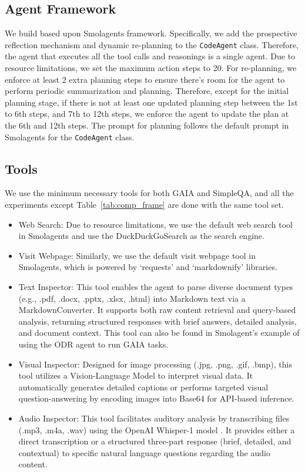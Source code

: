 
\subsection{Agent Framework}
We build \method based upon Smolagents \citep{smolagents} framework. Specifically, we add the prospective reflection mechanism and dynamic re-planning to the \texttt{CodeAgent} class. Therefore, the agent that executes all the tool calls and reasonings is a single agent. Due to resource limitations, we set the maximum action steps to 20. For re-planning, we enforce at least 2 extra planning steps to ensure there's room for the agent to perform periodic summarization and planning. Therefore, except for the initial planning stage, if there is not at least one updated planning step between the 1st to 6th steps, and 7th to 12th steps, we enforce the agent to update the plan at the 6th and 12th steps. The prompt for planning follows the default prompt in Smolagents for the \texttt{CodeAgent} class.

\subsection{Tools}
We use the minimum necessary tools for both GAIA and SimpleQA, and all the experiments except Table~\ref{tab:comp_frame} are done with the same tool set.
\begin{itemize}
    \item Web Search: Due to resource limitations, we use the default web search tool in Smolagents and use the DuckDuckGoSearch as the search engine.
    \item Visit Webpage: Similarly, we use the default visit webpage tool in Smolagents, which is powered by `requests' and `markdownify' libraries.
    \item Text Inspector: This tool enables the agent to parse diverse document types (e.g., .pdf, .docx, .pptx, .xlsx, .html) into Markdown text via a MarkdownConverter. It supports both raw content retrieval and query-based analysis, returning structured responses with brief answers, detailed analysis, and document context. This tool can also be found in Smolagent's example of using the ODR agent to run GAIA tasks.
    \item Visual Inspector: Designed for image processing (.jpg, .png, .gif, .bmp), this tool utilizes a Vision-Language Model to interpret visual data. It automatically generates detailed captions or performs targeted visual question-answering by encoding images into Base64 for API-based inference.
    \item Audio Inspector: This tool facilitates auditory analysis by transcribing files (.mp3, .m4a, .wav) using the OpenAI Whisper-1 model \citep{radford2023robust}. It provides either a direct transcription or a structured three-part response (brief, detailed, and contextual) to specific natural language questions regarding the audio content.
\end{itemize}

